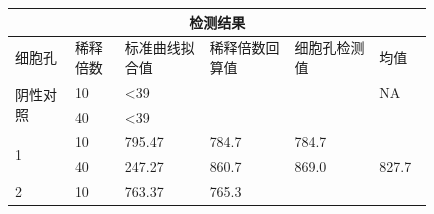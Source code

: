 \documentclass[UTF8,10pt,a4paper,fontset=fandol]{ctexart}
\newcommand{\fieldvalue}[1]{#1}
\newcommand{\handwritten}[1]{#1}
\begin{document}
\noindent
\begin{tabular}{|p{0.12\linewidth}|p{0.10\linewidth}|p{0.17\linewidth}|p{0.17\linewidth}|p{0.17\linewidth}|p{0.10\linewidth}|}
\hline
\multicolumn{6}{|c|}{检测结果} \\
\hline
细胞孔 & 稀释倍数 & 标准曲线拟合值 & 稀释倍数回算值 & 细胞孔检测值 & 均值 \\
\hline
\multirow{2}{*}{阴性对照}
&
\fieldvalue{\handwritten{10}}
&
\fieldvalue{\handwritten{<39}}
&
&
&
NA
\\
\cline{2-6}
&
\fieldvalue{\handwritten{40}}
&
\fieldvalue{\handwritten{<39}}
&
&
&
\\
\hline
\multirow{2}{*}{1}
&
\fieldvalue{\handwritten{10}}
&
\fieldvalue{\handwritten{795.47}}
&
\fieldvalue{\handwritten{784.7}}
&
\fieldvalue{\handwritten{784.7}}
&
\\
\cline{2-6}
&
\fieldvalue{\handwritten{40}}
&
\fieldvalue{\handwritten{247.27}}
&
\fieldvalue{\handwritten{860.7}}
&
\fieldvalue{\handwritten{869.0}}
&
\fieldvalue{\handwritten{827.7}}
\\
\hline
\multirow{2}{*}{2}
&
\fieldvalue{\handwritten{10}}
&
\fieldvalue{\handwritten{763.37}}
&
\fieldvalue{\handwritten{765.3}}

\end{tabular}
\end{document}
